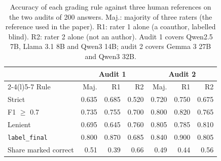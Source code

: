 \begin{table}[t]
\centering\footnotesize
\setlength{\tabcolsep}{3pt}
\caption{Accuracy of each grading rule against three human references on the two audits of 200 answers. Maj.: majority of three raters (the reference used in the paper). R1: rater 1 alone (a coauthor, labelled blind). R2: rater 2 alone (not an author). Audit 1 covers Qwen2.5 7B, Llama 3.1 8B and Qwen3 14B; audit 2 covers Gemma 3 27B and Qwen3 32B.}
\label{tab:p_rater}
\begin{tabular*}{\linewidth}{@{\extracolsep{\fill}}lrrrrrr@{}}
\toprule
 & \multicolumn{3}{c}{Audit 1} & \multicolumn{3}{c}{Audit 2} \\
\cmidrule(lr){2-4}\cmidrule(l){5-7}
Rule & Maj. & R1 & R2 & Maj. & R1 & R2 \\
\midrule
Strict & 0.635 & 0.685 & 0.520 & 0.720 & 0.750 & 0.675 \\
F1 $\geq$ 0.7 & 0.735 & 0.755 & 0.700 & 0.800 & 0.820 & 0.765 \\
Lenient & 0.695 & 0.645 & 0.760 & 0.805 & 0.785 & 0.810 \\
\texttt{label\_final} & 0.800 & 0.870 & 0.685 & 0.840 & 0.900 & 0.805 \\
\midrule
Share marked correct & 0.51 & 0.39 & 0.66 & 0.49 & 0.44 & 0.56 \\
\bottomrule
\end{tabular*}
\end{table}
